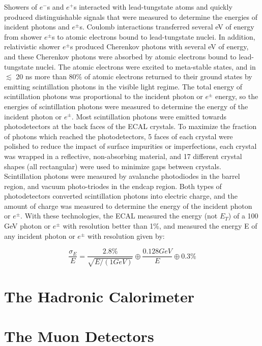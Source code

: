 Showers of $e^{-}$s and $e^{+}$s interacted with lead-tungstate atoms and quickly produced distinguishable 
signals that were measured to determine the energies of incident photons and $e^{\pm}$s.  Coulomb interactions 
transferred several eV of energy from shower $e^{\pm}$s to atomic electrons bound to lead-tungstate nuclei.  
In addition, relativistic shower $e^{\pm}$s produced Cherenkov photons with several eV of energy, and 
these Cherenkov photons were absorbed by atomic electrons bound to lead-tungstate nuclei.  The atomic 
electrons were excited to meta-stable states, and in $\lesssim$ 20 ns more than 80\% of atomic electrons 
returned to their ground states by emitting scintillation photons in the visible light regime.  The total energy of 
scintillation photons was proportional to the incident photon or $e^{\pm}$ energy, so the energies 
of scintillation photons were measured to determine the energy of the incident photon or $e^{\pm}$.  Most 
scintillation photons were emitted towards photodetectors at the back faces of the ECAL crystals.  To 
maximize the fraction of photons which reached the photodetectors, 5 faces of each crystal were polished 
to reduce the impact of surface impurities or imperfections, each crystal was wrapped in a reflective, 
non-absorbing material, and 17 different crystal shapes (all rectangular) were used to minimize gaps 
between crystals.  Scintillation photons were measured by avalanche photodiodes in the barrel region, 
and vacuum photo-triodes in the endcap region.  Both types of photodetectors converted scintillation 
photons into electric charge, and the amount of charge was measured to determine the energy of the 
incident photon or $e^{\pm}$.  With these technologies, the ECAL measured the energy (not $E_{T}$) of 
a 100 GeV photon or $e^{\pm}$ with resolution better than 1\%, and measured the energy E of any 
incident photon or $e^{\pm}$ with resolution given by:

\begin{equation}
	\frac{\sigma_{E}}{E} = \frac{2.8\%}{\sqrt{E/(1 GeV)}} \oplus \frac{0.128 GeV}{E} \oplus 0.3\%
\end{equation}



\section{The Hadronic Calorimeter}
\label{sec:hcalDescription}


\section{The Muon Detectors}
\label{sec:muonDetectorsDescription}

